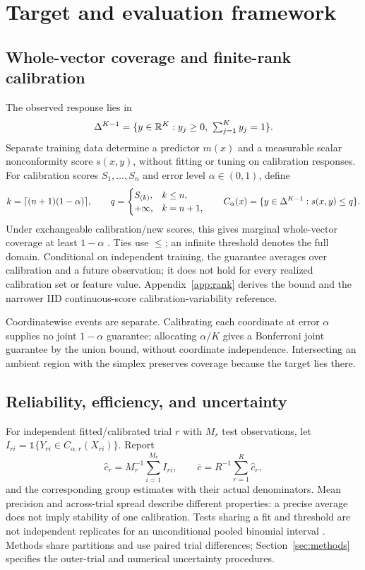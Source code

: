 \section{Target and evaluation framework}
\label{sec:framework}
\subsection{Whole-vector coverage and finite-rank calibration}
The observed response lies in
\begin{equation}
\simplex=\{y\in\R^K:y_j\geq0,\ \textstyle\sum_{j=1}^K y_j=1\}.
\end{equation}
Separate training data determine a predictor $m(x)$ and a measurable scalar nonconformity score $s(x,y)$, without fitting or tuning on calibration responses. For calibration scores $S_1,\ldots,S_n$ and error level $\alpha\in(0,1)$, define
\begin{equation}
 k=\lceil(n+1)(1-\alpha)\rceil,\qquad
 q=\begin{cases}S_{(k)},& k\leq n,\\+\infty,& k=n+1,\end{cases}
 \qquad C_\alpha(x)=\{y\in\Delta^{K-1}:s(x,y)\leq q\}.
 \label{eq:rank}
\end{equation}
Under exchangeable calibration/new scores, this gives marginal whole-vector coverage at least $1-\alpha$ \citep{angelopoulos2021gentle}. Ties use $\leq$; an infinite threshold denotes the full domain. Conditional on independent training, the guarantee averages over calibration and a future observation; it does not hold for every realized calibration set or feature value. Appendix~\ref{app:rank} derives the bound and the narrower IID continuous-score calibration-variability reference.

Coordinatewise events are separate. Calibrating each coordinate at error $\alpha$ supplies no joint $1-\alpha$ guarantee; allocating $\alpha/K$ gives a Bonferroni joint guarantee by the union bound, without coordinate independence. Intersecting an ambient region with the simplex preserves coverage because the target lies there.

\subsection{Reliability, efficiency, and uncertainty}
For independent fitted/calibrated trial $r$ with $M_r$ test observations, let $I_{ri}=\mathbb1\{Y_{ri}\in C_{\alpha,r}(X_{ri})\}$. Report
\begin{equation}
\widehat c_r=M_r^{-1}\sum_{i=1}^{M_r}I_{ri},\qquad
\overline c=R^{-1}\sum_{r=1}^R\widehat c_r,
\label{eq:coverage}
\end{equation}
and the corresponding group estimates with their actual denominators. Mean precision and across-trial spread describe different properties: a precise average does not imply stability of one calibration. Tests sharing a fit and threshold are not independent replicates for an unconditional pooled binomial interval \citep{angelopoulos2021gentle}. Methods share partitions and use paired trial differences; Section~\ref{sec:methods} specifies the outer-trial and numerical uncertainty procedures.

